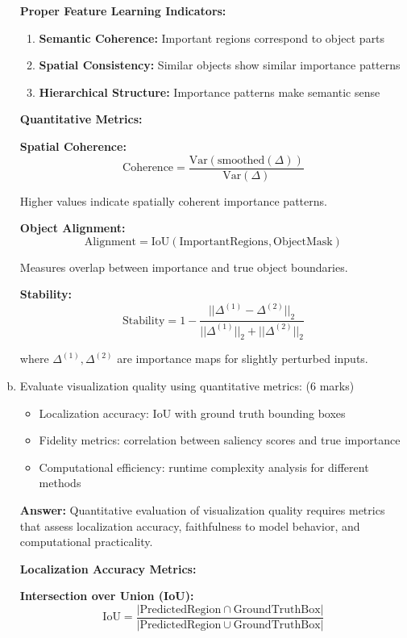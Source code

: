\documentclass[12pt]{article}
\newcommand{\answer}[1]{{\color{answercolor}\textbf{Answer:} #1}}
\newcommand{\explanation}[1]{{\color{explanationcolor}#1}}
\begin{document}
\begin{enumerate}[(a)]
{    \textbf{Proper Feature Learning Indicators:}
    \begin{enumerate}
        \item \textbf{Semantic Coherence:} Important regions correspond to object parts
        \item \textbf{Spatial Consistency:} Similar objects show similar importance patterns
        \item \textbf{Hierarchical Structure:} Importance patterns make semantic sense
    \end{enumerate}
    
    \textbf{Quantitative Metrics:}
    
    \textbf{Spatial Coherence:}
    $$\text{Coherence} = \frac{\text{Var}(\text{smoothed}(\Delta))}{\text{Var}(\Delta)}$$
    
    Higher values indicate spatially coherent importance patterns.
    
    \textbf{Object Alignment:}
    $$\text{Alignment} = \text{IoU}(\text{ImportantRegions}, \text{ObjectMask})$$
    
    Measures overlap between importance and true object boundaries.
    
    \textbf{Stability:}
    $$\text{Stability} = 1 - \frac{||\Delta^{(1)} - \Delta^{(2)}||_2}{||\Delta^{(1)}||_2 + ||\Delta^{(2)}||_2}$$
    
    where $\Delta^{(1)}, \Delta^{(2)}$ are importance maps for slightly perturbed inputs.
    }
    
    \item Evaluate visualization quality using quantitative metrics: \hfill (6 marks)
    \begin{itemize}
        \item Localization accuracy: IoU with ground truth bounding boxes
        \item Fidelity metrics: correlation between saliency scores and true importance
        \item Computational efficiency: runtime complexity analysis for different methods
    \end{itemize}
    
    \answer{Quantitative evaluation of visualization quality requires metrics that assess localization accuracy, faithfulness to model behavior, and computational practicality.}
    
    \explanation{
    \textbf{Localization Accuracy Metrics:}
    
    \textbf{Intersection over Union (IoU):}
    $$\text{IoU} = \frac{|\text{PredictedRegion} \cap \text{GroundTruthBox}|}{|\text{PredictedRegion} \cup \text{GroundTruthBox}|}$$
    
}
\end{enumerate}
\end{document}

